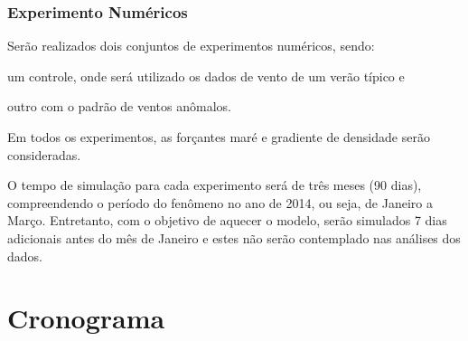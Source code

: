 \subsubsection{Experimento Numéricos}
\label{sub:experimentos}

\hspace{6mm} Serão realizados dois conjuntos de experimentos numéricos, sendo: 
\begin{enumerate*}[label=(\alph*)]
  \item um controle, onde será utilizado os dados de vento de um verão típico e
  \item outro com o padrão de ventos anômalos.
\end{enumerate*}
Em todos os experimentos, as forçantes maré e gradiente de densidade serão consideradas.

\hspace{6mm} O tempo de simulação para cada experimento será de três meses (90 dias), compreendendo
o período do fenômeno no ano de 2014, ou seja, de Janeiro a Março. Entretanto, com o objetivo de 
aquecer o modelo, serão simulados 7 dias adicionais antes do mês de Janeiro e estes não serão
contemplado nas análises dos dados.






\section{Cronograma} %
\label{sec:cronograma}

